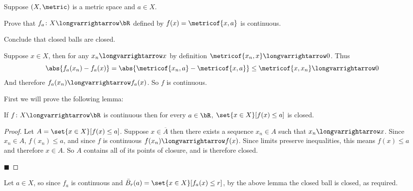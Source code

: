 \documentclass[10pt]{article}
\begin{document}


\bigskip

\begin{exercise*}

    Suppose $(X,\metric)$ is a metric space and $a\in X$.
    \benum
        \item Prove that $f_a\colon X\longvarrightarrow\bR$ defined by $f(x)=\metricof{x,a}$ is continuous.
        \item Conclude that closed balls are closed.
    \eenum

\end{exercise*}

\begin{blankpp}

    \benum
        \item Suppose $x\in X$, then for any $x_n\longvarrightarrow x$ by definition $\metricof{x_n,x}\longvarrightarrow0$.
        Thus
        \[ \abs{f_a(x_n) - f_a(x)} = \abs{\metricof{x_n,a}-\metricof{x,a}} \leq \metricof{x,x_n} \longvarrightarrow 0 \]
        And therefore $f_a(x_n)\longvarrightarrow f_a(x)$.
        So $f$ is continuous.
        \item First we will prove the following lemma:
        \begin{lemm}
            If $f\colon X\longvarrightarrow\bR$ is continuous then for every $a\in\bR$, $\set{x\in X}[f(x)\leq a]$ is closed.
        \end{lemm}

        \begin{proof}
            Let $A=\set{x\in X}[f(x)\leq a]$.
            Suppose $x\in\overline A$ then there exists a sequence $x_n\in A$ such that $x_n\longvarrightarrow x$.
            Since $x_n\in A$, $f(x_n)\leq a$, and since $f$ is continuous $f(x_n)\longvarrightarrow f(x)$.
            Since limits preserve inequalities, this means $f(x)\leq a$ and therefore $x\in A$.
            So $A$ contains all of its points of closure, and is therefore closed.

            \hfill$\blacksquare$
        \end{proof}
        Let $a\in X$, so since $f_a$ is continuous and $\bar B_r(a)=\set{x\in X}[f_a(x)\leq r]$, by the above lemma the closed ball is closed, as required.
    \eenum

\end{blankpp}
\end{document}
